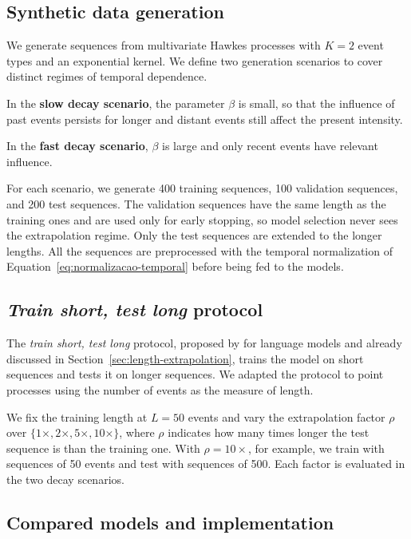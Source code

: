 \subsection{Synthetic data generation}
\label{subsec:geracao-dados}

We generate sequences from multivariate Hawkes processes with $K = 2$ event types and an exponential kernel. We define two generation scenarios to cover distinct regimes of temporal dependence.

In the \textbf{slow decay scenario}, the parameter $\beta$ is small, so that the influence of past events persists for longer and distant events still affect the present intensity.

In the \textbf{fast decay scenario}, $\beta$ is large and only recent events have relevant influence.

For each scenario, we generate 400 training sequences, 100 validation sequences, and 200 test sequences. The validation sequences have the same length as the training ones and are used only for early stopping, so model selection never sees the extrapolation regime. Only the test sequences are extended to the longer lengths. All the sequences are preprocessed with the temporal normalization of Equation~\eqref{eq:normalizacao-temporal} before being fed to the models.

\subsection{\textit{Train short, test long} protocol}
\label{subsec:train-short-test-long}

The \textit{train short, test long} protocol, proposed by  for language models and already discussed in Section~\ref{sec:length-extrapolation}, trains the model on short sequences and tests it on longer sequences. We adapted the protocol to point processes using the number of events as the measure of length.

We fix the training length at $L = 50$ events and vary the extrapolation factor $\rho$ over $\{1\times, 2\times, 5\times, 10\times\}$, where $\rho$ indicates how many times longer the test sequence is than the training one. With $\rho = 10\times$, for example, we train with sequences of 50 events and test with sequences of 500. Each factor is evaluated in the two decay scenarios.

\subsection{Compared models and implementation}
\label{subsec:modelos-comparados}

